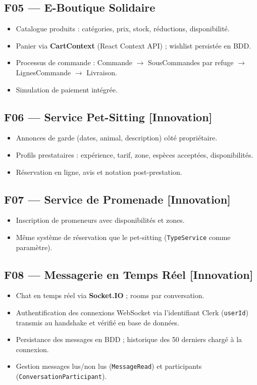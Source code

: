 \documentclass[12pt,a4paper]{report}
\begin{document}
\subsection{F05 --- E-Boutique Solidaire}
\begin{itemize}[leftmargin=2em,itemsep=2pt]
  \item Catalogue produits : catégories, prix, stock, réductions, disponibilité.
  \item Panier via \textbf{CartContext} (React Context API) ; wishlist persistée en BDD.
  \item Processus de commande : Commande $\rightarrow$ SousCommandes par refuge $\rightarrow$ LignesCommande $\rightarrow$ Livraison.
  \item Simulation de paiement intégrée.
\end{itemize}

\subsection{F06 --- Service Pet-Sitting \textnormal{[Innovation]}}
\begin{itemize}[leftmargin=2em,itemsep=2pt]
  \item Annonces de garde (dates, animal, description) côté propriétaire.
  \item Profils prestataires : expérience, tarif, zone, espèces acceptées, disponibilités.
  \item Réservation en ligne, avis et notation post-prestation.
\end{itemize}

\subsection{F07 --- Service de Promenade \textnormal{[Innovation]}}
\begin{itemize}[leftmargin=2em,itemsep=2pt]
  \item Inscription de promeneurs avec disponibilités et zones.
  \item Même système de réservation que le pet-sitting (\texttt{TypeService} comme paramètre).
\end{itemize}

\subsection{F08 --- Messagerie en Temps Réel \textnormal{[Innovation]}}
\begin{itemize}[leftmargin=2em,itemsep=2pt]
  \item Chat en temps réel via \textbf{Socket.IO} ; rooms par conversation.
  \item Authentification des connexions WebSocket via l'identifiant Clerk (\texttt{userId}) transmis au handshake et vérifié en base de données.
  \item Persistance des messages en BDD ; historique des 50 derniers chargé à la connexion.
  \item Gestion messages lus/non lus (\texttt{MessageRead}) et participants (\texttt{ConversationParticipant}).
\end{itemize}
\end{document}
